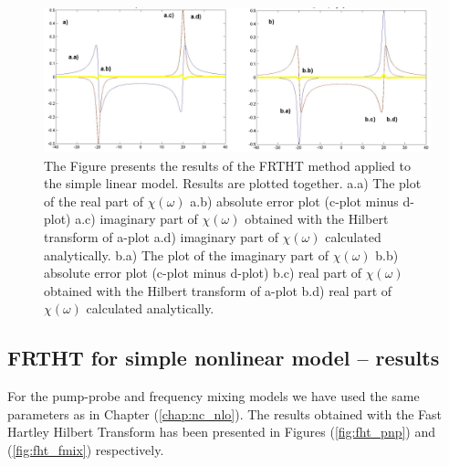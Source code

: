 \documentclass[12pt,twoside,a4paper]{article}
\numberwithin{equation}{subsection}
\numberwithin{figure}{subsection}
\begin{document}
\begin{figure} 
  \includegraphics[width=150mm]{img/fht_lin.png}
  \caption{The Figure presents the results of the FRTHT method applied to the simple linear model. Results are plotted together.
   a.a) The plot of the real part of $\chi (\omega )$ 
   a.b) absolute error plot (c-plot minus d-plot) 
   a.c) imaginary part of $\chi (\omega )$ obtained with the Hilbert transform of a-plot 
   a.d) imaginary part of $\chi (\omega )$  calculated analytically. 
   b.a) The plot of the imaginary part of $\chi (\omega )$ 
   b.b) absolute error plot (c-plot minus d-plot) 
   b.c) real part of $\chi (\omega )$ obtained with the Hilbert transform of a-plot 
   b.d) real part of $\chi (\omega )$ calculated analytically. \label{fig:fht_lin}
  }
\end{figure}

\subsection{FRTHT for simple nonlinear model -- results} \label{chap:hartley_nlo}

For the pump-probe and frequency mixing models we have used the same parameters as in Chapter (\ref{chap:nc_nlo}). The results obtained with the Fast Hartley Hilbert Transform has been presented in Figures (\ref{fig:fht_pnp}) and (\ref{fig:fht_fmix}) respectively.
\end{document}
